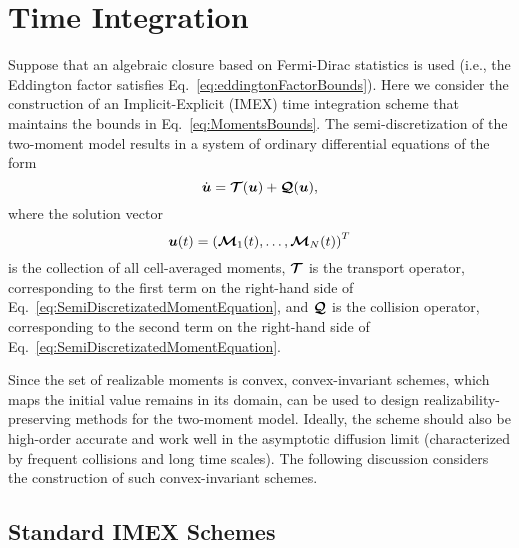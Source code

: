 \section{Time Integration} \label{se:TimeIntegration}

Suppose that an algebraic closure based on Fermi-Dirac statistics is used (i.e., the Eddington factor satisfies Eq.~\eqref{eq:eddingtonFactorBounds}).
Here we consider the construction of an Implicit-Explicit (IMEX) time integration scheme that maintains the bounds in Eq.~\eqref{eq:MomentsBounds}.  
The semi-discretization of the two-moment model results in a system of ordinary differential equations of the form
\begin{equation}
  \dot{\boldsymbol{u}} = \boldsymbol{\mathcal{T}}(\boldsymbol{u}) + \boldsymbol{\mathcal{Q}}(\boldsymbol{u}),
\end{equation}
where the solution vector
\begin{equation}
  \boldsymbol{u}(t) = \left( \boldsymbol{\mathcal{M}}_{1}(t),\ldots,\boldsymbol{\mathcal{M}}_{N}(t)\right) ^{T}
\end{equation}
is the collection of all cell-averaged moments, $\boldsymbol{\mathcal{T}}$ is the transport operator, corresponding to the first term on the right-hand side of Eq.~\eqref{eq:SemiDiscretizatedMomentEquation}, and $\boldsymbol{\mathcal{Q}}$ is the collision operator, corresponding to the second term on the right-hand side of Eq.~\eqref{eq:SemiDiscretizatedMomentEquation}.  

Since the set of realizable moments is convex, convex-invariant schemes, which maps the initial value remains in its domain, can be used to design realizability-preserving methods for the two-moment model.
Ideally, the scheme should also be high-order accurate and work well in the asymptotic diffusion limit (characterized by frequent collisions and long time scales).  
The following discussion considers the construction of such convex-invariant schemes.  

\subsection{Standard IMEX Schemes}

